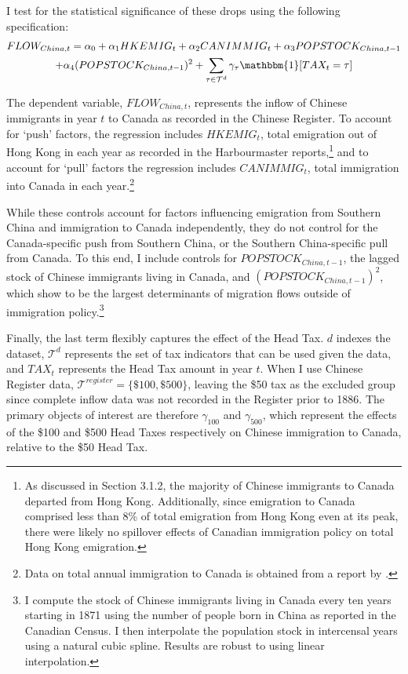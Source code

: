 I test for the statistical significance of these drops using the following specification: 
\begin{multline}
    \label{eq:immflow1}
    FLOW_{China,t} = \alpha_0 + \alpha_1 HKEMIG_t + \alpha_2 CANIMMIG_t + \alpha_3 POPSTOCK_{China, t-1} \\ + \alpha_4 (POPSTOCK_{China, t-1})^2 + \sum_{\tau \in \mathcal{T}^d} \gamma_\tau \mathbbm{1}[TAX_t = \tau]
\end{multline}

The dependent variable, $FLOW_{China,t}$, represents the inflow of Chinese immigrants in year $t$ to Canada as recorded in the Chinese Register. To account for `push' factors, the regression includes $HKEMIG_t$, total emigration out of Hong Kong in each year as recorded in the Harbourmaster reports,\footnote{As discussed in Section 3.1.2, the majority of Chinese immigrants to Canada departed from Hong Kong. Additionally, since emigration to Canada comprised less than 8\% of total emigration from Hong Kong even at its peak, there were likely no spillover effects of Canadian immigration policy on total Hong Kong emigration.} and to account for `pull' factors the regression includes $CANIMMIG_t$, total immigration into Canada in each year.\footnote{Data on total annual immigration to Canada is obtained from a report by \citet{canimm}.}

While these controls account for factors influencing emigration from Southern China and immigration to Canada independently, they do not control for the Canada-specific push from Southern China, or the Southern China-specific pull from Canada. To this end, I include controls for $POPSTOCK_{China,t-1}$, the lagged stock of Chinese immigrants living in Canada, and $(POPSTOCK_{China,t-1})^2$, which \citet{Clarketal2007} show to be the largest determinants of migration flows outside of immigration policy.\footnote{I compute the stock of Chinese immigrants living in Canada every ten years starting in 1871 using the number of people born in China as reported in the Canadian Census. I then interpolate the population stock in intercensal years using a natural cubic spline. Results are robust to using linear interpolation.}

Finally, the last term flexibly captures the effect of the Head Tax. $d$ indexes the dataset, $\mathcal{T}^d$ represents the set of tax indicators that can be used given the data, and $TAX_t$ represents the Head Tax amount in year $t$. When I use Chinese Register data, $\mathcal{T}^{register} = \{\$100,\$500\}$, leaving the \$50 tax as the excluded group since complete inflow data was not recorded in the Register prior to 1886. The primary objects of interest are therefore $\gamma_{100}$ and $\gamma_{500}$, which represent the effects of the \$100 and \$500 Head Taxes respectively on Chinese immigration to Canada, relative to the \$50 Head Tax.

